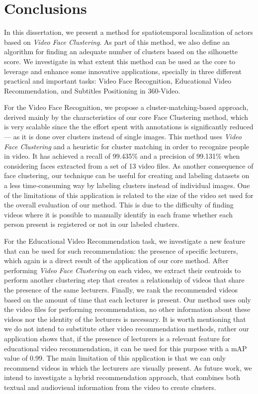 \newpage

\chapter{Conclusions}
\label{chap:conclusions}

In this dissertation, we present a method for spatiotemporal localization of actors based on \emph{Video Face Clustering}. As part of this method, we also define an algorithm for finding an adequate number of clusters based on the silhouette score. We investigate in what extent this method can be used as the core to leverage and enhance some innovative applications, specially in three different  practical and important tasks: Video Face Recognition, Educational Video Recommendation, and Subtitles Positioning in 360-Video.

For the Video Face Recognition, we propose a cluster-matching-based approach, derived mainly by the characteristics of our core Face Clustering method, which is very scalable since the the effort spent with annotations is significantly reduced --- as it is done over clusters instead of single images. This method uses \emph{Video Face Clustering} and a heuristic for cluster matching in order to recognize people in video. It has achieved a recall of 99.435\% and a precision of 99.131\% when considering faces extracted from a set of 13 video files. As another consequence of face clustering, our technique can be useful for creating and labeling datasets on a less time-consuming way by labeling clusters instead of individual images. One of the limitations of this application is related to the size of the video set used for the overall evaluation of our method. This is due to the difficulty of finding videos where it is possible to manually identify in each frame whether each person present is registered or not in our labeled clusters.

For the Educational Video Recommendation task, we investigate a new feature that can be used for such recommendation: the presence of specific lecturers, which again is a direct result of the application of our core method. After performing \emph{Video Face Clustering} on each video, we extract their centroids to perform another clustering step that creates a relationship of videos that share the presence of the same lecturers. Finally, we rank the recommended videos based on the amount of time that each lecturer is present. Our method uses only the video files for performing recommendation, no other information about these videos nor the identity of the lecturers is necessary. It is worth mentioning that we do not intend to substitute other video recommendation methods, rather our application shows that, if the presence of lecturers is a relevant feature for educational video recommendation, it can be used for this purpose with a mAP value of 0.99. The main limitation of this application is that we can only recommend videos in which the lecturers are visually present. As future work, we intend to investigate a hybrid recommendation approach, that combines both textual and audiovisual information from the video to create clusters.

